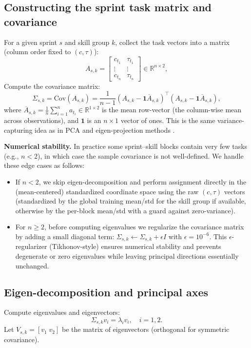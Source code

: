 \documentclass[journal]{IEEEtran}
\begin{document}
\subsection{Constructing the sprint task matrix and covariance}
For a given sprint $s$ and skill group $k$, collect the task vectors into a matrix (column order fixed to $(c,\tau)$):
\[
A_{s,k} =
\begin{bmatrix}
c_{t_1} & \tau_{t_1} \\
\vdots & \vdots \\
c_{t_n} & \tau_{t_n}
\end{bmatrix}
\in \mathbb{R}^{n \times 2},
\]
Compute the covariance matrix:
\begin{equation}
\label{eq:cov}
\Sigma_{s,k} = \mathrm{Cov}(A_{s,k}) = \frac{1}{n-1} (A_{s,k} - \mathbf{1}\overline{A}_{s,k})^\top (A_{s,k} - \mathbf{1}\overline{A}_{s,k}),
\end{equation}
where \(\overline{A}_{s,k}=\frac{1}{n}\sum_{i=1}^n a_{t_i}\in\mathbb{R}^{1\times 2}\) is the mean row-vector (the column-wise mean across observations), and \(\mathbf{1}\) is an \(n\times 1\) vector of ones. This is the same variance-capturing idea as in PCA and eigen-projection methods \cite{pca2017,eigen_projection}.

\noindent\textbf{Numerical stability.} In practice some sprint–skill blocks contain very few tasks (e.g., \(n<2\)), in which case the sample covariance is not well-defined. We handle these edge cases as follows:
\begin{itemize}[leftmargin=*]
    \item If \(n<2\), we skip eigen-decomposition and perform assignment directly in the (mean-centered) standardized coordinate space using the raw \((c,\tau)\) vectors (standardized by the global training mean/std for the skill group if available, otherwise by the per-block mean/std with a guard against zero-variance). 
    \item For \(n\ge2\), before computing eigenvalues we regularize the covariance matrix by adding a small diagonal term: \(\Sigma_{s,k}\leftarrow\Sigma_{s,k}+\epsilon I\) with \(\epsilon=10^{-6}\). This \(\epsilon\)-regularizer (Tikhonov-style) ensures numerical stability and prevents degenerate or zero eigenvalues while leaving principal directions essentially unchanged.
\end{itemize}

\subsection{Eigen-decomposition and principal axes}
Compute eigenvalues and eigenvectors:
\[
\Sigma_{s,k} v_i = \lambda_i v_i, \quad i=1,2.
\]
Let $V_{s,k} = [v_1 \; v_2]$ be the matrix of eigenvectors (orthogonal for symmetric covariance).
\end{document}
